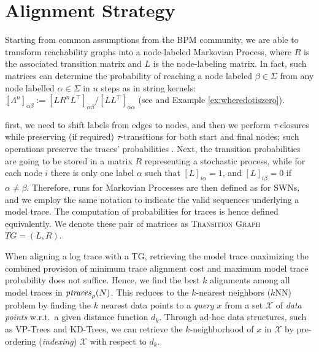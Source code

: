 \section{Alignment Strategy}\label{subsec:as}

Starting from common assumptions from the BPM community, we are able to transform reachability graphs into a node-labeled Markovian Process, where  $R$ is the associated transition matrix and $L$ is the node-labeling matrix. In fact, such matrices can determine the probability of reaching a node labeled $\beta\in\Sigma$ from any node labelled $\alpha\in\Sigma$ in $n$ steps as in string kernels:   $[\Lambda^n]_{\alpha\beta}:=[LR^nL^\top]_{\alpha\beta}/[LL^\top]_{\alpha\alpha}$ (see \cite{GartnerFW03} and Example \ref{ex:wheredotiszero}).
%

first, we need to shift labels from edges to nodes, and then we perform $\tau$-closures while preserving (if required) $\tau$-transitions for both start and final nodes; such operations preserve the traces' probabilities \cite{Bergami21}. Next, the transition probabilities are going to be stored in a matrix $R$ representing a stochastic process, while for each node $i$ there is only one label $\alpha$ such that $[L]_{i\alpha}=1$, and $[L]_{i\beta}=0$ if $\alpha\neq\beta$. Therefore, runs for Markovian Processes are then defined as for SWNs, and we employ the same notation to indicate the valid sequences underlying a model trace. The computation of probabilities for traces is hence defined equivalently. We denote these pair of matrices as \textsc{Transition Graph} $TG=(L,R)$.


When aligning a log trace with a TG, retrieving the model trace maximizing the combined provision of minimum trace alignment cost
and maximum model trace probability does not suffice.
Hence, we find the best $k$ alignments among all  model traces in $\mathit{ptraces}_{\rho}(N)$. This reduces to the
$k$-nearest neighbors ($k$NN) problem by finding the $k$ nearest data points to a \textit{query} $x$ from a set
$\mathcal{X}$ of \textit{data points} w.r.t.\ a given distance function $d_k$. Through ad-hoc data structures, such as VP-Trees
and KD-Trees, %
we can retrieve the $k$-neighborhood of $x$ in $\mathcal{X}$ by pre-ordering (\textit{indexing}) $\mathcal{X}$ with respect to $d_k$.
%

